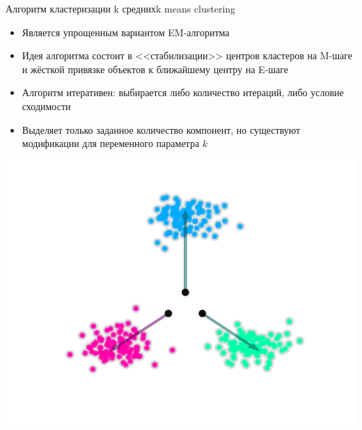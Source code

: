 \documentclass[compress,unicode]{beamer}
\begin{document}
\begin{frame}{Алгоритм кластеризации k средних}{k means clustering}
\begin{itemize}
	\item Является упрощенным вариантом EM-алгоритма
	\item Идея алгоритма состоит в <<стабилизации>> центров кластеров на M-шаге и жёсткой привязке объектов к ближайшему центру на E-шаге
	\item Алгоритм итеративен: выбирается либо количество итераций, либо условие сходимости
	\item Выделяет только заданное количество компонент, но существуют модификации для переменного параметра $k$
\end{itemize}
\end{frame}

\begin{frame}{}
\includegraphics[width=\textwidth]{k-means}
\end{frame}
\end{document}

